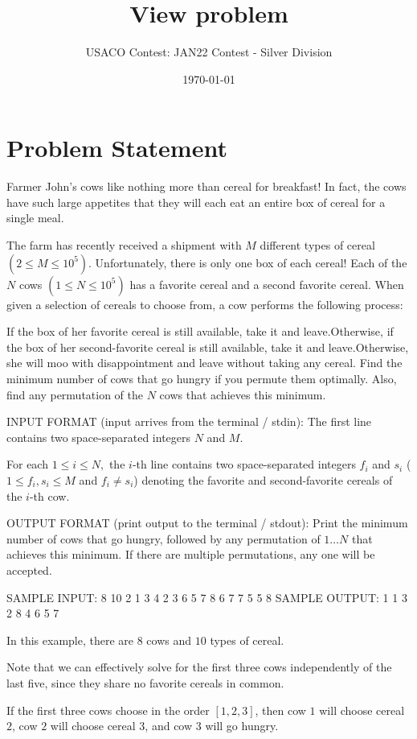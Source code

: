 \documentclass[12pt]{article}
\title{View problem}
\author{USACO Contest: JAN22 Contest - Silver Division}
\date{\today}
\begin{document}
\maketitle

\section*{Problem Statement}

Farmer John's cows like nothing more than cereal for breakfast!  In fact, the
cows have such large appetites that they will each eat an entire box of cereal
for a single meal.

The farm has recently received a shipment with $M$ different types of cereal
$(2\le M\le 10^5)$. Unfortunately, there is only one box of each cereal!  Each
of the $N$ cows $(1\le N\le 10^5)$ has a favorite cereal and a second favorite
cereal. When given a selection of cereals to choose from, a cow performs the
following process:

If the box of her favorite cereal is still available, take it and
leave.Otherwise, if the box of her second-favorite cereal is still available, 
take it and leave.Otherwise, she will moo with disappointment and leave without taking any
cereal.
Find the minimum number of cows that go hungry if you permute them optimally.
Also, find any permutation of the $N$ cows that achieves this minimum.

INPUT FORMAT (input arrives from the terminal / stdin):
The first line contains two space-separated integers $N$ and $M.$

For each $1\le i\le N,$ the $i$-th line contains two space-separated integers
$f_i$ and $s_i$ ($1\le f_i,s_i\le M$ and $f_i\neq s_i$) denoting the favorite
and second-favorite cereals of the $i$-th cow.

OUTPUT FORMAT (print output to the terminal / stdout):
Print the minimum number of cows that go hungry, followed by any permutation of
$1\ldots N$ that achieves this minimum. If there are multiple permutations, any
one will be accepted.

SAMPLE INPUT:
8 10
2 1
3 4
2 3
6 5
7 8
6 7
7 5
5 8
SAMPLE OUTPUT: 
1
1
3
2
8
4
6
5
7

In this example, there are $8$ cows and $10$ types of cereal. 

Note that we can effectively solve for the first three cows independently of 
the last five, since they share no favorite cereals in common.

If the first three cows choose in the order $[1,2,3]$, then cow $1$ will choose
cereal $2$, cow $2$ will choose cereal $3$, and cow $3$ will go hungry. 
\end{document}
